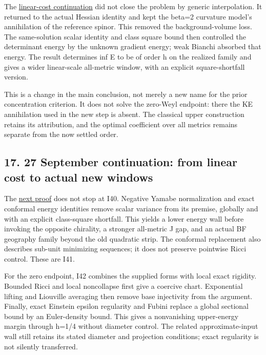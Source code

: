 \documentclass[
  10pt,
]{article}
\begin{document}
The
\href{../continuation/20260927_mixed_current_and_signed_cores.md}{linear-cost
continuation} did not close the problem by generic interpolation. It
returned to the actual Hessian identity and kept the beta=2 curvature
model's annihilation of the reference spinor. This removed the
background-volume loss. The same-solution scalar identity and class
square bound then controlled the determinant energy by the unknown
gradient energy; weak Bianchi absorbed that energy. The result
determines inf E to be of order h on the realized family and gives a
wider linear-scale all-metric window, with an explicit square-shortfall
version.

This is a change in the main conclusion, not merely a new name for the
prior concentration criterion. It does not solve the zero-Weyl endpoint:
there the KE annihilation used in the new step is absent. The classical
upper construction retains its attribution, and the optimal coefficient
over all metrics remains separate from the now settled order.

\hypertarget{september-continuation-from-linear-cost-to-actual-new-windows}{%
\subsection{17. 27 September continuation: from linear cost to actual
new
windows}\label{september-continuation-from-linear-cost-to-actual-new-windows}}

The
\href{../continuation/20260927_conformal_separation_and_zero_end.md}{next
proof} does not stop at I40. Negative Yamabe normalization and exact
conformal energy identities remove scalar variance from its premise,
globally and with an explicit class-square shortfall. This yields a
lower energy wall before invoking the opposite chirality, a stronger
all-metric J gap, and an actual BF geography family beyond the old
quadratic strip. The conformal replacement also describes sub-unit
minimizing sequences; it does not preserve pointwise Ricci control.
These are I41.

For the zero endpoint, I42 combines the supplied forms with local exact
rigidity. Bounded Ricci and local noncollapse first give a coercive
chart. Exponential lifting and Liouville averaging then remove base
injectivity from the argument. Finally, exact Einstein epsilon
regularity and Fubini replace a global sectional bound by an
Euler-density bound. This gives a nonvanishing upper-energy margin
through h=1/4 without diameter control. The related approximate-input
wall still retains its stated diameter and projection conditions; exact
regularity is not silently transferred.
\end{document}
